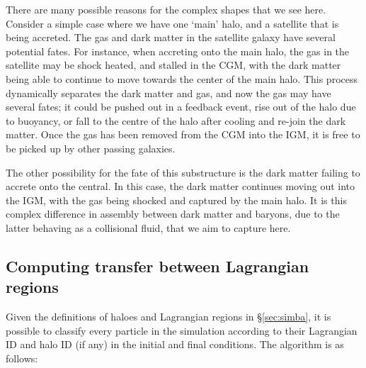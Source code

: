 \documentclass[fleqn,usenatbib]{mnras}
\begin{document}
There are many possible reasons for the complex shapes that we see here.
Consider a simple case where we have one `main' halo, and a satellite that is
being accreted. The gas and dark matter in the satellite galaxy have several
potential fates. For instance, when accreting onto the main halo, the gas in
the satellite may be shock heated, and stalled in the CGM, with the dark
matter being able to continue to move towards the center of the main halo.
This process dynamically separates the dark matter and gas, and now the gas
may have several fates; it could be pushed out in a feedback event, rise out
of the halo due to buoyancy, or fall to the centre of the halo after cooling
and re-join the dark matter. Once the gas has been removed from the CGM into
the IGM, it is free to be picked up by other passing galaxies.

The other possibility for the fate of this substructure is the dark matter
failing to accrete onto the central. In this case, the dark matter continues
moving out into the IGM, with the gas being shocked and captured by the main
halo. It is this complex difference in assembly between dark matter and
baryons, due to the latter behaving as a collisional fluid, that we aim to
capture here.

\subsection{Computing transfer between Lagrangian regions}

Given the definitions of haloes and Lagrangian regions in
\S \ref{sec:simba}, it is possible to classify every particle in the
simulation according to their Lagrangian ID and halo ID (if any) in the
initial and final conditions. The algorithm is as follows:
\end{document}
